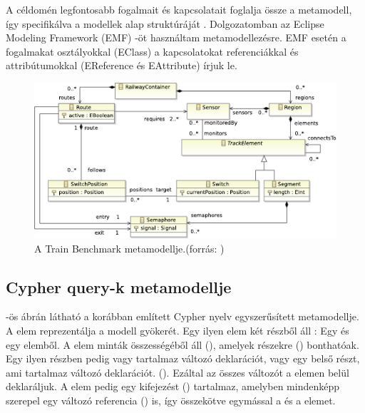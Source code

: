 A céldomén legfontosabb fogalmait és kapcsolatait foglalja össze a metamodell, így specifikálva a modellek alap struktúráját \cite{semerath2017formal}. Dolgozatomban az Eclipse Modeling Framework (EMF) \cite{EMF} -öt használtam metamodellezésre. EMF esetén a fogalmakat osztályokkal (EClass) a kapcsolatokat referenciákkal és attribútumokkal (EReference és EAttribute) írjuk le.

\begin{figure}
	\centering
	\includegraphics[width=1\textwidth]{figures/trainbenchmarkfig2}
	\caption{A Train Benchmark metamodellje.(forrás: \cite{szarnyas2018train})}
	\label{fig:trainbenchmarkmetamodell}
\end{figure}

\subsection{Cypher query-k metamodellje}

 -ös ábrán látható a korábban említett Cypher nyelv egyszerűsített metamodellje.
A  elem reprezentálja a modell gyökerét. Egy ilyen elem két részből áll : Egy  
és egy  elemből. A  elem minták összességéből áll (), amelyek 
részekre () bonthatóak. Egy ilyen részben pedig vagy tartalmaz változó deklarációt,
vagy egy belső részt, ami tartalmaz változó deklarációt. ().
Ezáltal az összes változót a  elemen belül deklaráljuk. A  elem  pedig egy
kifejezést () tartalmaz, amelyben mindenképp szerepel egy változó referencia
 () is, így összekötve egymással a  és a  elemet. 

